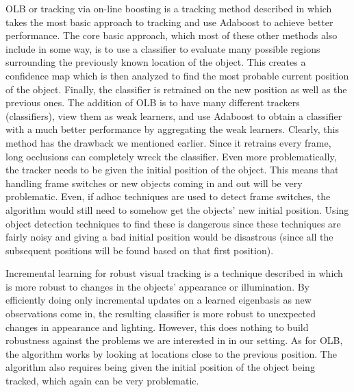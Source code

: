\documentclass{article}
\begin{document}
OLB or tracking via on-line boosting is a tracking method described in \cite{OLB} which takes the most basic approach to tracking and use Adaboost to achieve better performance.
The core basic approach, which most of these other methods also include in some way, is to use a classifier to evaluate many possible regions surrounding the previously known location of the object.
This creates a confidence map which is then analyzed to find the most probable current position of the object. Finally, the classifier is retrained on the new position as well as the previous ones.
The addition of OLB is to have many different trackers (classifiers), view them as weak learners, and use Adaboost to obtain a classifier with a much better performance by aggregating the weak learners.
Clearly, this method has the drawback we mentioned earlier. Since it retrains every frame, long occlusions can completely wreck the classifier. Even more problematically, the tracker needs to be given the
initial position of the object. This means that handling frame switches or new objects coming in and out will be very problematic. Even, if adhoc techniques are used to detect frame switches, the algorithm
would still need to somehow get the objects' new initial position. Using object detection techniques to find these is dangerous since these techniques are fairly noisy and giving a bad initial position would
be disastrous (since all the subsequent positions will be found based on that first position).

Incremental learning for robust visual tracking is a technique described in \cite{IVT} which is more robust to changes in the objects' appearance or illumination. By efficiently doing only incremental updates 
on a learned eigenbasis as new observations come in, the resulting classifier is more robust to unexpected changes in appearance and lighting. However, this does nothing to build robustness against the problems
we are interested in in our setting. As for OLB, the algorithm works by looking at locations close to the previous position. The algorithm also requires being given the initial position of the 
object being tracked, which again can be very problematic.
\end{document}
